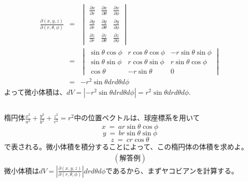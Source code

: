 \documentclass[a4paper,11pt,fleqn]{jarticle}
\begin{document}
\begin{itemize}
\begin{eqnarray*}
\frac{\partial (x, y, z)}{\partial (r , \theta , \phi )}&=&
\begin{vmatrix}
\frac{\partial x}{\partial r}  &\frac{\partial x}{\partial \theta}  &\frac{\partial x}{\partial \phi} \\
\frac{\partial y}{\partial r}  &\frac{\partial y}{\partial \theta}  &\frac{\partial y}{\partial \phi} \\
\frac{\partial z}{\partial r}  &\frac{\partial z}{\partial \theta}  &\frac{\partial z}{\partial \phi}
\end{vmatrix}
\\&=&
\begin{vmatrix}
\sin\theta\cos\phi &r\cos\theta\cos\phi &-r\sin\theta\sin\phi \\
\sin\theta\sin\phi &r\cos\theta\sin\phi &r\sin\theta\cos\phi \\
\cos\theta &-r\sin\theta &0
\end{vmatrix}
\\&=&-r^2\sin\theta drd\theta d\phi
\end{eqnarray*}
よって微小体積は、$dV=|-r^2\sin\theta drd\theta d\phi |=r^2\sin\theta drd\theta d\phi$.
\end{itemize}


\newpage
\subsection{}
楕円体$\frac{x^2}{a^2}+\frac{y^2}{b^2}+\frac{z^2}{c^2}=r^2$中の位置ベクトルは、球座標系を用いて
$$x~=~ar\sin\theta\cos\phi$$
$$y~=~br\sin\theta\sin\phi$$
$$z~=~cr\cos\theta$$
で表される。微小体積を積分することによって、この楕円体の体積を求めよ。\\
\begin{eqnarray*}
(解答例)
\end{eqnarray*}
微小体積は$dV=\left| \frac{\partial (x,y,z)}{\partial (r ,\theta ,\phi )}\right| dr d\theta d\phi$であるから、まずヤコビアンを計算する。
\end{document}
